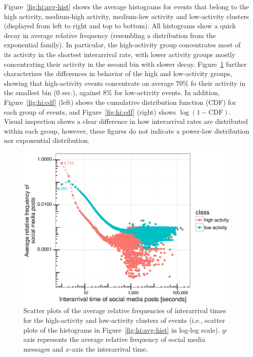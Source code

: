 Figure~\ref{fig:hi:avg-hist} shows the average histograms for events that belong
to the high activity, medium-high activity, medium-low activity and low-activity
clusters (displayed from left to right and top to bottom). 
%
All histograms show a quick decay in average relative frequency (resembling a
distribution from the exponential family). 
%
In particular, the high-activity group concentrates most of its activity in the
shortest interarrival rate, with lower activity groups mostly concentrating
their activity in the second bin with slower decay. 
%
Figure~\ref{fig:hi:scatter} further characterizes the differences in behavior of
the high and low-activity groups, showing that high-activity events concentrate
on average $70\%$ fo their activity in the smallest bin ($0$ sec.), against
$8\%$ for low-activity events. 
%
In addition, Figure~\ref{fig:hi:cdf} (left) shows the cumulative distribution
function (CDF) for each group of events, and Figure~\ref{fig:hi:cdf} (right)
shows $\log{(1 - \mathrm{CDF})}$. 
%
Visual inspection shows a clear difference in how interarrival rates are
distributed within each group, however, these figures do not indicate a
power-law distribution nor exponential distribution.%

\begin{figure}[!htb]
  \centering
    \includegraphics[width=\textwidth]{figures/high-activity/fig5}
  \caption{Scatter plots of the average relative frequencies of interarrival
times for the high-activity and low-activity clusters of events (i.e., scatter
plots of the histograms in Figure~\ref{fig:hi:avg-hist} in log-log scale). $y$-axis
represents the average relative frequency of social media messages and $x$-axis
the interarrival time.}
\label{fig:hi:scatter}
\end{figure}

